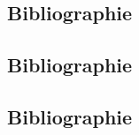 \documentclass{these-dbl}
\begin{document}


\clearpage


\subsection*{Bibliographie}
\printbibliography[heading=none]

\clearemptydoublepage



\clearpage


\subsection*{Bibliographie}
\printbibliography[heading=none]

\clearemptydoublepage



\clearpage


\subsection*{Bibliographie}
\printbibliography[heading=none]

\clearemptydoublepage




\clearemptydoublepage


\backmatter

\clearemptydoublepage
\cleartoevenpage[\thispagestyle{empty}]

\end{document}
